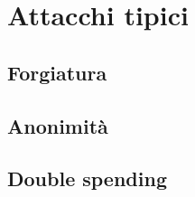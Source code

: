 \documentclass{beamer}
\begin{document}
\section{Attacchi tipici}
\subsection{Forgiatura}
	
	
\subsection{Anonimità}
	
\subsection{Double spending}
	
\end{document}
